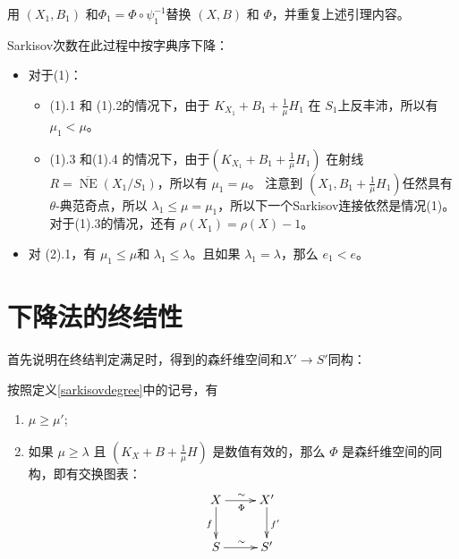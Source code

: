 用  $(X_1,B_1)$ 和$\Phi_{1}=\Phi\circ\psi_1^{-1}$替换 $(X,B)$ 和 $\Phi$，并重复上述引理内容。 
\begin{assertion}\label{R-Sarkisovdeg}
  Sarkisov次数在此过程中按字典序下降：
  \begin{itemize}
    \item 对于(1)：
      \begin{itemize}
            \item  (1).1 和 (1).2的情况下，由于 $ K_{X_1}+B_1+\frac{1}{\mu}H_1 $ 在 $S_1$上反丰沛，所以有 $\mu_1<\mu$。
            \item (1).3 和(1).4 的情况下，由于$ (K_{X_1}+B_1+\frac{1}{\mu}H_1) $ 在射线 $ R=\overline{\operatorname{NE}}(X_1/S_1) $，所以有 $\mu_1=\mu$。
              注意到 $ (X_1,B_1+\frac{1}{\mu}H_1) $任然具有$ \theta $-典范奇点，所以 $\lambda_1\leqslant \mu=\mu_1$，所以下一个Sarkisov连接依然是情况(1)。对于(1).3的情况，还有 $\rho(X_1)=\rho(X)-1$。
      \end{itemize}
    \item 对 (2).1，有 $\mu_1\leqslant \mu$和  $\lambda_1\leqslant \lambda$。且如果 $ \lambda_1=\lambda $，那么 $e_1<e$。
  \end{itemize}
\end{assertion}

\section{下降法的终结性}\label{termination1}
首先说明在终结判定满足时，得到的森纤维空间和$X'\to S'$同构：
\begin{theorem}\label{nfi}
  按照定义\ref{sarkisovdegree}中的记号，有
  \begin{enumerate}
    \item $ \mu\geqslant \mu' $;
    \item 如果 $ \mu \geqslant \lambda $ 且 $ (K_X+B+\frac{1}{\mu} H) $ 是数值有效的，那么 $\Phi$ 是森纤维空间的同构，即有交换图表：
          \[ \xymatrix{
              X\ar[r]^\sim_{\Phi}\ar[d]_f&X'\ar[d]^{f'}\\
              S\ar[r]^\sim& S' } \]
  \end{enumerate}
\end{theorem}

